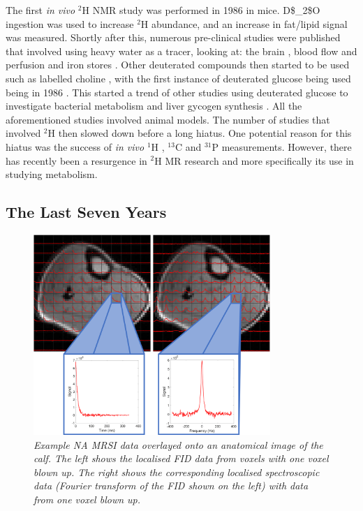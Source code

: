 The first \textit{in vivo} $^2$H NMR study was performed in 1986 \cite{Brereton1986PreliminarySpectroscopy} in mice. \Ac{D$_2$O} ingestion was used to increase $^2$H abundance, and an increase in fat/lipid signal was measured. Shortly after this, numerous pre-clinical studies were published that involved using heavy water as a tracer, looking at: the brain \cite{Ewy1988DeuteriumSitu}, blood flow and perfusion \cite{Ackerman1987DeuteriumTracer.} and iron stores \cite{Irving1987InSpectroscopy}. Other deuterated compounds then started to be used such as labelled choline \cite{Eng1990RenalStudy}, with the first instance of deuterated glucose being used being in 1986 \cite{Barrow1986NMRMobilis}. This started a trend of other studies using deuterated glucose to investigate bacterial metabolism \cite{Aguayo1988HighMetabolism.} and liver gycogen synthesis \cite{Goodman1989UseSynthesis}. All the aforementioned studies involved animal models. The number of studies that involved $^2$H then slowed down before a long hiatus. One potential reason for this hiatus was the success of \textit{in vivo} $^1$H \cite{Harada1984IdentificationScience}, $^{13}$C \cite{Cohen1980UseLiver} and $^{31}$P \cite{Sappey-Marinier1992EffectSpectroscopy} measurements. However, there has recently been a resurgence in $^2$H MR research and more specifically its use in studying metabolism.

\subsection{The Last Seven Years}

\begin{figure}[H]
    \centering
    \includegraphics[width=0.8\textwidth]{Figures/Intro/CSI.png}
    \caption{\textit{Example \ac{NA} \ac{MRSI} data overlayed onto an anatomical image of the calf. The left shows the localised \ac{FID} data from voxels with one voxel blown up. The right shows the corresponding localised spectroscopic data (Fourier transform of the \ac{FID} shown on the left) with data from one voxel blown up.}}
    \label{fig:intro:CSI}
\end{figure}


